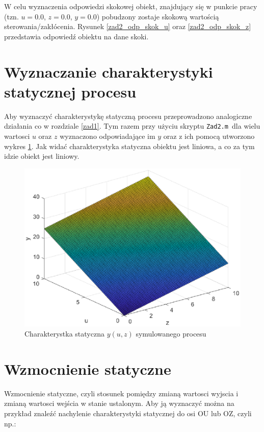 W celu wyznaczenia odpowiedzi skokowej obiekt, znajdujący się w punkcie pracy (tzn. $u= \num{0.0}$, $z= \num{0.0}$, $y= \num{0.0}$) pobudzony zostaje skokową wartością sterowania/zakłócenia. Rysunek \ref{zad2_odp_skok_u} oraz \ref{zad2_odp_skok_z} przedstawia odpowiedź obiektu na dane skoki.

\section{Wyznaczanie charakterystyki statycznej procesu}
\label{zad2_char_stat}
Aby wyznaczyć charakterystykę statyczną procesu przeprowadzono analogiczne działania co w rozdziale \ref{zad1}. Tym razem przy użyciu skryptu \verb+Zad2.m +dla wielu wartosci $u$ oraz $z$ wyznaczono odpowiadające im $y$ oraz z ich pomocą utworzono wykres \ref{zad2_char_stat}. Jak widać charakterystyka statyczna obiektu jest liniowa, a co za tym idzie obiekt jest liniowy.

\begin{figure}[b]   
     \label{zad2_char_stat}
    \centering
    \includegraphics[scale=1]{Rys/char_stat.eps}
    \caption{Charakterystka statyczna $y(u,z)$ symulowanego procesu}

\end{figure}

\section{Wzmocnienie statyczne}
\label{zad2_wzmocnienie}
Wzmocnienie statyczne, czyli stosunek pomiędzy zmianą wartosci wyjscia i zmianą wartosci wejścia w stanie ustalonym. Aby ją wyznaczyć można na przykład znaleźć nachylenie charakterystyki statycznej do osi OU lub OZ, czyli np.:

